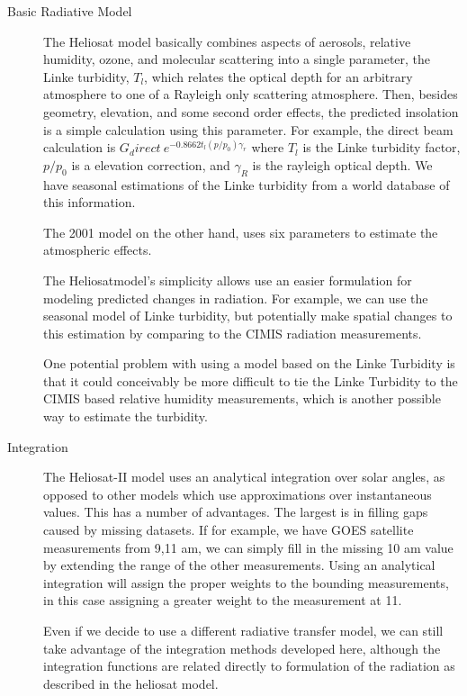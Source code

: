 \documentclass[letterpaper]{article}
\newcommand{\hel}{Heliosat}
\begin{document}
\begin{description}

\item[Basic Radiative Model] 
  
  The Heliosat model basically combines aspects of aerosols, relative
  humidity, ozone, and molecular scattering into a single parameter,
  the Linke turbidity, $T_l$, which relates the optical depth for an
  arbitrary atmosphere to one of a Rayleigh only scattering
  atmosphere.  Then, besides geometry, elevation, and some second
  order effects, the predicted insolation is a simple calculation
  using this parameter.  For example, the direct beam calculation is
  $G_direct ~ e^{-0.8662t_l(p/p_0)\gamma_r}$ where $T_l$ is the Linke
  turbidity factor, $p/p_0$ is a elevation correction, and $\gamma_R$
  is the rayleigh optical depth.  We have seasonal estimations of the
  Linke turbidity from a world database of this information.
  
  The 2001 model on the other hand, uses six parameters to estimate
  the atmospheric effects.
  
  The \hel model's simplicity allows use an easier formulation for
  modeling predicted changes in radiation.  For example, we can use
  the seasonal model of Linke turbidity, but potentially make spatial
  changes to this estimation by comparing to the CIMIS radiation
  measurements.
  
  One potential problem with using a model based on the Linke
  Turbidity is that it could conceivably be more difficult to tie the
  Linke Turbidity to the CIMIS based relative humidity measurements,
  which is another possible way to estimate the turbidity.
  
\item[Integration] 
 
  The \hel-II model uses an analytical integration over solar angles,
  as opposed to other models which use approximations over
  instantaneous values.  This has a number of advantages.  The largest
  is in filling gaps caused by missing datasets.  If for example, we
  have GOES satellite measurements from 9,11 am, we can simply fill in
  the missing 10 am value by extending the range of the other
  measurements.  Using an analytical integration will assign the
  proper weights to the bounding measurements, in this case assigning
  a greater weight to the measurement at 11.
  
  Even if we decide to use a different radiative transfer model, we
  can still take advantage of the integration methods developed here,
  although the integration functions are related directly to
  formulation of the radiation as described in the heliosat model.



\end{description}
\end{document}
